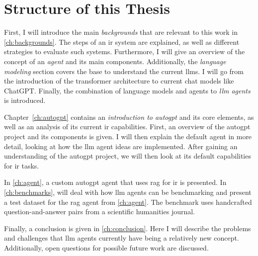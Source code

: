 \documentclass[../main.tex]{subfiles}
\begin{document}
\section{Structure of this Thesis}

First, I will introduce the main \emph{backgrounds}
that are relevant to this work in \autoref{ch:backgrounds}.
The steps of an \gls{ir} system are explained, as well
as different strategies to evaluate such systems.
Furthermore, I will give an overview of the concept of an \emph{agent} and its main components.
Additionally, the \emph{language modeling} section covers the base
to understand the current \glspl{llm}.
I will go from the introduction of the transformer architecture to current chat models like ChatGPT.
Finally, the combination of language models and agents to \emph{\gls{llm} agents} is introduced.

Chapter~\ref{ch:autogpt} contains an \emph{introduction to \gls{autogpt}} and its core elements,
as well as an analysis of its current \gls{ir} capabilities.
First, an overview of the \gls{autogpt} project and its components is given.
I will then explain the default agent in more detail,
looking at how the \gls{llm} agent ideas are implemented.
After gaining an understanding of the \gls{autogpt} project,
we will then look at its default capabilities for \gls{ir} tasks.

In \autoref{ch:agent},
a custom \gls{autogpt} agent that uses \gls{rag} for \gls{ir} is presented.
In \autoref{ch:benchmarks}, will deal with how \gls{llm} agents can be benchmarking
and present a test dataset for the \gls{rag} agent from \autoref{ch:agent}.
The benchmark uses handcrafted question-and-answer pairs from a scientific humanities journal.

Finally, a conclusion is given in \autoref{ch:conclusion}.
Here I will describe the problems and challenges
that \gls{llm} agents currently have being a relatively new concept.
Additionally, open questions for possible future work are discussed.
\end{document}
